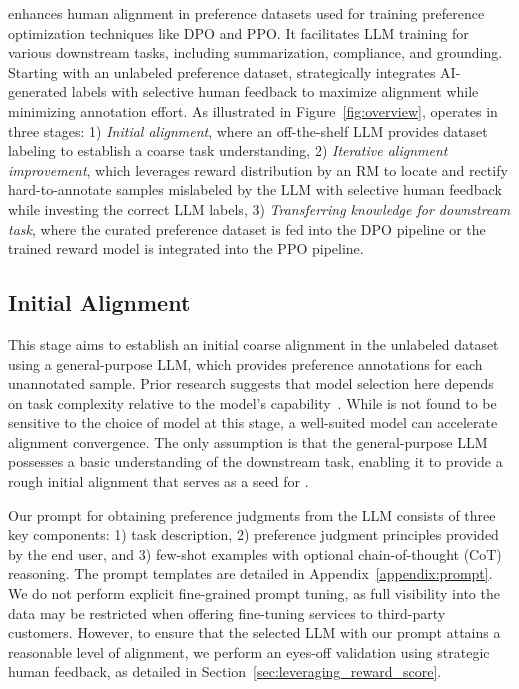 \myname{} enhances human alignment in preference datasets used for training preference optimization techniques like DPO and PPO. It facilitates LLM training for various downstream tasks, including summarization, compliance, and grounding. Starting with an unlabeled preference dataset, \myname{} strategically integrates AI-generated labels with selective human feedback to maximize alignment while minimizing annotation effort. As illustrated in Figure~\ref{fig:overview}, \myname{} operates in three stages: 1) \textit{Initial alignment}, where an off-the-shelf LLM provides dataset labeling to establish a coarse task understanding, 2) \textit{Iterative alignment improvement}, which leverages reward distribution by an RM to locate and rectify hard-to-annotate samples mislabeled by the LLM with selective human feedback while investing the correct LLM labels, 3) \textit{Transferring knowledge for downstream task}, where the curated preference dataset is fed into the DPO pipeline or the trained \myname{} reward model is integrated into the PPO pipeline.



\subsection{Initial Alignment}
\label{sec:design:init}

This stage aims to establish an initial coarse alignment in the unlabeled dataset using a general-purpose LLM, which provides preference annotations for each unannotated sample. Prior research suggests that model selection here depends on task complexity relative to the model's capability~\cite{snell2024scaling}. While \myname{} is not found to be sensitive to the choice of model at this stage, a well-suited model can accelerate alignment convergence. The only assumption is that the general-purpose LLM possesses a basic understanding of the downstream task, enabling it to provide a rough initial alignment that serves as a seed for \myname{}.     

Our prompt for obtaining preference judgments from the LLM consists of three key components: 1) task description, 2) preference judgment principles provided by the end user, and 3) few-shot examples with optional chain-of-thought (CoT) reasoning. The prompt templates are detailed in Appendix~\ref{appendix:prompt}. We do not perform explicit fine-grained prompt tuning, as full visibility into the data may be restricted when offering fine-tuning services to third-party customers. However, to ensure that the selected LLM with our prompt attains a reasonable level of alignment, we perform an eyes-off validation using strategic human feedback, as detailed in Section~\ref{sec:leveraging_reward_score}.   

